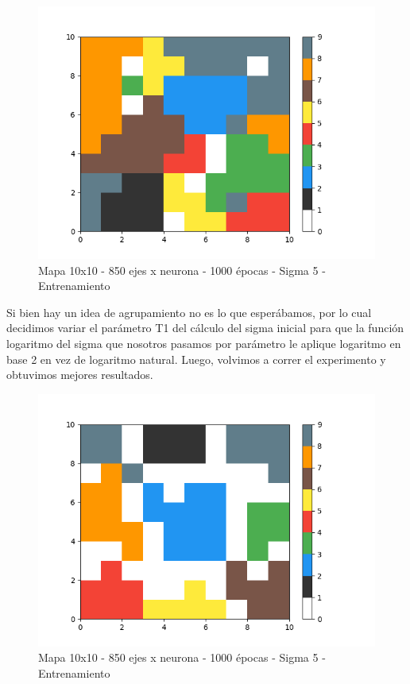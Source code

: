 \begin{figure}[h]
  \begin{center}
    \includegraphics[scale=0.6]{../img/map_1000ep_850en.png}
  \caption{Mapa 10x10 - 850 ejes x neurona - 1000 épocas - Sigma 5 - Entrenamiento}
  \end{center}
\end{figure}

Si bien hay un idea de agrupamiento no es lo que esperábamos, por lo cual decidimos variar el parámetro T1 del cálculo del sigma inicial para que la función logaritmo del sigma que nosotros pasamos por parámetro le aplique logaritmo en base 2 en vez de logaritmo natural. Luego, volvimos a correr el experimento y obtuvimos mejores resultados.

\begin{figure}[h]
  \begin{center}
    \includegraphics[scale=0.6]{../img/map_1000ep_850en_v2.png}
  \caption{Mapa 10x10 - 850 ejes x neurona - 1000 épocas - Sigma 5 - Entrenamiento}
  \end{center}
\end{figure}

